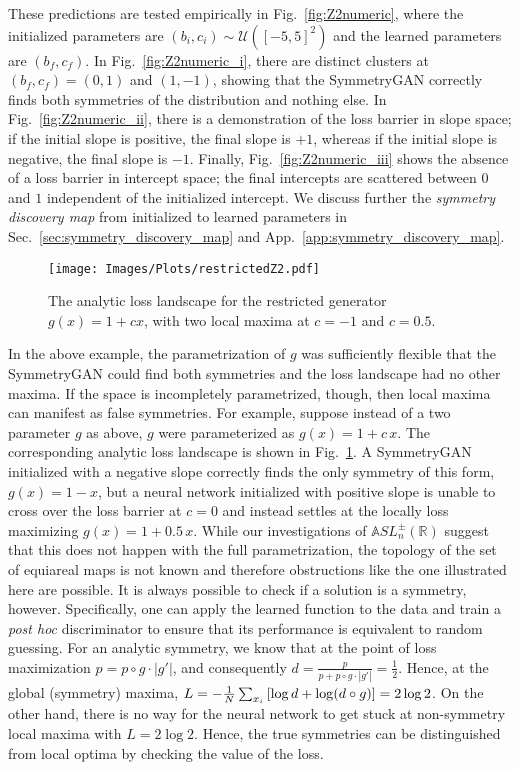 \documentclass[aps,prx,reprint,preprintnumbers,superscriptaddress,nofootinbib,longbibliography,floatfix]{revtex4-1}
\newcommand{\A}{\mathbb{A}}
\newcommand{\R}{\mathbb{R}}
\DeclareRobustCommand{\Sec}[1]{Sec.~\ref{sec:#1}}
\DeclareRobustCommand{\App}[1]{App.~\ref{app:#1}}
\DeclareRobustCommand{\Fig}[1]{Fig.~\ref{fig:#1}}
\begin{document}
    These predictions are tested empirically in \Fig{Z2numeric}, where the initialized parameters are $(b_i,c_i)\sim \mathcal{U}([-5, 5]^2)$ and the learned parameters are $(b_f,c_f)$.
    In \Fig{Z2numeric_i}, there are distinct clusters at $(b_f, c_f) = (0, 1)$ and $(1, -1)$,
    showing that the SymmetryGAN correctly finds both symmetries of the distribution and nothing else.
    In \Fig{Z2numeric_ii}, there is a demonstration of the loss barrier in slope space; if the initial slope is positive, the final slope is $+1$, whereas if the initial slope is negative, the final slope is $-1$.
    Finally, \Fig{Z2numeric_iii} shows the absence of a loss barrier in intercept space; the final intercepts are scattered between $0$ and $1$ independent of the initialized intercept. 
    We discuss further the \emph{symmetry discovery map} from initialized to learned parameters in \Sec{symmetry_discovery_map} and \App{symmetry_discovery_map}.
    
\begin{figure}
    \centering
    \texttt{[image: Images/Plots/restrictedZ2.pdf]}
    \caption{
    The analytic loss landscape for the restricted generator $g(x) = 1 + cx$, with two local maxima at $c = -1$ and $c = 0.5$.}
    \label{fig:Z2restricted}
\end{figure}
    
In the above example, the parametrization of $g$ was sufficiently flexible that the SymmetryGAN could find both symmetries and the loss landscape had no other maxima.
%
If the space is incompletely parametrized, though, then local maxima can manifest as false symmetries.
%
For example, suppose instead of a two parameter $g$ as above, $g$ were parameterized as $g(x) = 1 + c\, x$.
%
The corresponding analytic loss landscape is shown in \Fig{Z2restricted}.
%
A SymmetryGAN initialized with a negative slope correctly finds the only symmetry of this form, $g(x) = 1 - x$, but a neural network initialized with positive slope is unable to cross over the loss barrier at $c = 0$ and instead settles at the locally loss maximizing $g(x) = 1 + 0.5 \,x$.
%
While our investigations of $\A SL_n^\pm(\R)$ suggest that this does not happen with the full parametrization, the topology of the set of equiareal maps is not known and therefore obstructions like the one illustrated here are possible.
%
It is always possible to check if a solution is a symmetry, however.
%
Specifically, one can apply the learned function to the data and train a \textit{post hoc} discriminator to ensure that its performance is equivalent to random guessing.
%
For an analytic symmetry, we know that at the point of loss maximization  $p = p\circ g\cdot |g'|$, and consequently $d = \frac{p}{p + p\circ g\cdot |g'|} = \frac12$.
%
Hence, at the global (symmetry) maxima, $L = - \frac1N\sum_{x_i}\qty[\log d + \log (d\circ g)] = 2\log2$.
%
On the other hand, there is no way for the neural network to get stuck at non-symmetry local maxima with $L = 2 \log 2$.
%
Hence, the true symmetries can be distinguished from local optima by checking the value of the loss.
\end{document}
